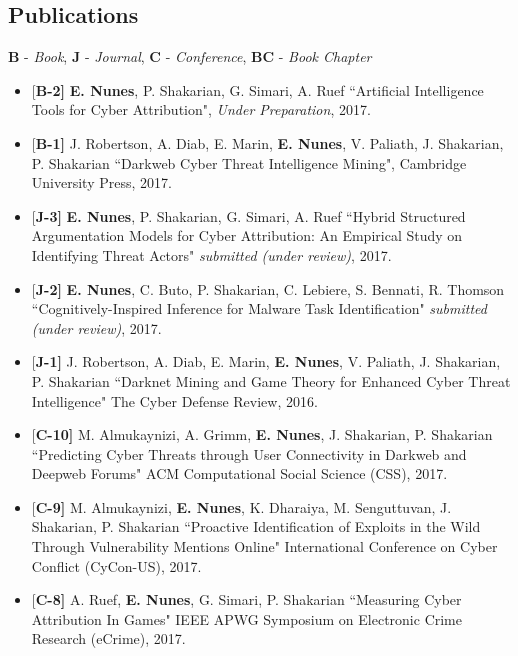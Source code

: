 \documentclass[margin,line]{CV}
\begin{document}
\begin{resume}
\section{\sc Publications}
{\bf *B} - {\em Book}, {\bf*J} - {\em Journal}, {\bf *C} - {\em Conference}, {\bf*BC} - {\em Book Chapter}\\

\begin{itemize}[leftmargin =*]

\item {[\bf B-2]}  {\bf E. Nunes}, P. Shakarian, G. Simari, A. Ruef ``Artificial Intelligence Tools for Cyber Attribution", {\em Under Preparation}, 2017. 

\item {[\bf B-1]} J. Robertson, A. Diab, E. Marin, {\bf E. Nunes}, V. Paliath, J. Shakarian, P. Shakarian ``Darkweb Cyber Threat Intelligence Mining", Cambridge University Press, 2017. 

\item {[\bf J-3]} {\bf E. Nunes}, P. Shakarian, G. Simari, A. Ruef ``Hybrid Structured Argumentation Models for Cyber Attribution: An Empirical Study on Identifying Threat Actors" {\em submitted (under review)}, 2017.

\item {[\bf J-2]} {\bf E. Nunes}, C. Buto, P. Shakarian, C. Lebiere, S. Bennati, R. Thomson ``Cognitively-Inspired Inference for Malware Task Identification" {\em submitted (under review)}, 2017.

\item {[\bf J-1]} J. Robertson, A. Diab, E. Marin, {\bf E. Nunes}, V. Paliath, J. Shakarian, P. Shakarian ``Darknet Mining and Game Theory for Enhanced Cyber Threat Intelligence" The Cyber Defense Review, 2016.

\item {[\bf C-10]} M. Almukaynizi, A. Grimm, {\bf E. Nunes}, J. Shakarian, P. Shakarian  ``Predicting Cyber Threats through User Connectivity in Darkweb and Deepweb Forums" ACM Computational Social Science (CSS), 2017.

\item {[\bf C-9]} M. Almukaynizi, {\bf E. Nunes}, K. Dharaiya, M. Senguttuvan, J. Shakarian, P. Shakarian  ``Proactive Identification of Exploits in the Wild Through Vulnerability Mentions Online" International Conference on Cyber Conflict (CyCon-US), 2017.


\item {[\bf C-8]} A. Ruef, {\bf E. Nunes}, G. Simari, P. Shakarian  ``Measuring Cyber Attribution In Games" IEEE APWG Symposium on Electronic Crime Research (eCrime), 2017.



\end{itemize}
\end{resume}
\end{document}
